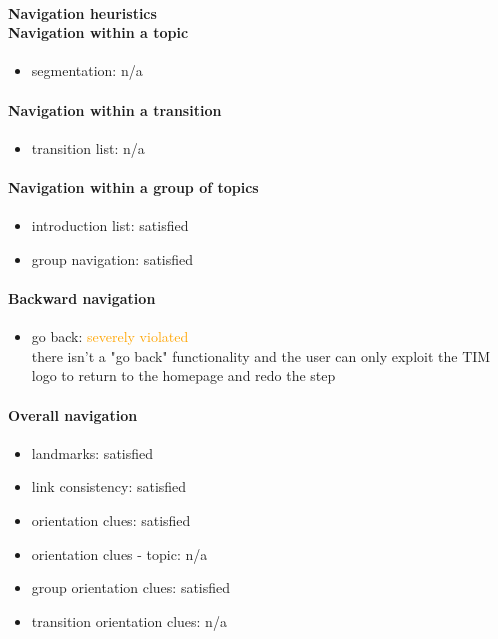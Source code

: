 \begin{enumerate}
	\paragraph*{Navigation heuristics \\ Navigation within a topic}
	\begin{itemize}
		\item segmentation: n/a
	\end{itemize}	
	
	\paragraph*{Navigation within a transition}
	\begin{itemize}
		\item transition list: n/a
	\end{itemize}
	
	\paragraph*{Navigation within a group of topics}
	\begin{itemize}
		\item introduction list: satisfied
		\item group navigation: satisfied
	\end{itemize}

	\paragraph*{Backward navigation}
	\begin{itemize}
		\item go back: \textcolor {orange}{severely violated}\\
		there isn't a "go back" functionality and the user can only exploit the TIM logo to return to the homepage and redo the step
	\end{itemize}
	
	\paragraph*{Overall navigation}
	\begin{itemize}
		\item landmarks: satisfied
		\item link consistency: satisfied
		\item orientation clues: satisfied
		\item orientation clues - topic: n/a
		\item group orientation clues: satisfied
		\item transition orientation clues: n/a
	\end{itemize}	
	

\end{enumerate}
